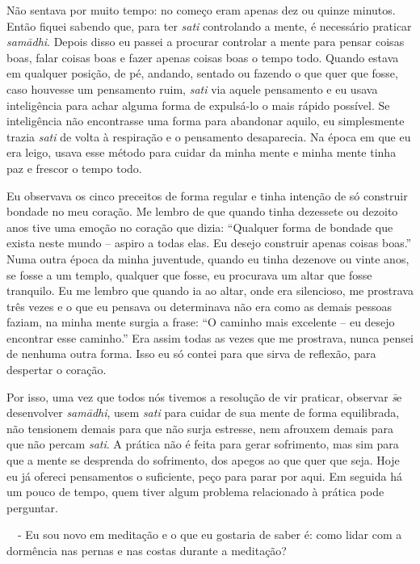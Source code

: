 Não sentava por muito tempo: no começo eram apenas dez ou quinze
minutos. Então fiquei sabendo que, para ter \textit{sati }controlando a
mente, é necessário praticar \textit{sam\=adhi}. Depois disso eu passei
a procurar controlar a mente para pensar coisas boas, falar coisas boas
e fazer apenas coisas boas o tempo todo. Quando estava em qualquer
posição, de pé, andando, sentado ou fazendo o que quer que fosse, caso
houvesse um pensamento ruim, \textit{sati }via aquele pensamento e eu
usava inteligência para achar alguma forma de expulsá-lo o mais rápido
possível. Se inteligência não encontrasse uma forma para abandonar
aquilo, eu simplesmente trazia \textit{sati }de volta à respiração e o
pensamento desaparecia. Na época em que eu era leigo, usava esse método
para cuidar da minha mente e minha mente tinha paz e frescor o tempo
todo.

Eu observava os cinco preceitos de forma regular e tinha intenção de
só construir bondade no meu coração. Me lembro de que quando tinha
dezessete ou dezoito anos tive uma emoção no coração que dizia:
“Qualquer forma de bondade que exista neste mundo – aspiro a todas
elas. Eu desejo construir apenas coisas boas.” Numa outra época da
minha juventude, quando eu tinha dezenove ou vinte anos, se fosse a um
templo, qualquer que fosse, eu procurava um altar que fosse tranquilo.
Eu me lembro que quando ia ao altar, onde era silencioso, me prostrava
três vezes e o que eu pensava ou determinava não era como as demais
pessoas faziam, na minha mente surgia a frase: “O caminho mais
excelente – eu desejo encontrar esse caminho.” Era assim todas as vezes
que me prostrava, nunca pensei de nenhuma outra forma. Isso eu só
contei para que sirva de reflexão, para despertar o coração. 

Por isso, uma vez que todos nós tivemos a resolução de vir praticar,
observar \textit{s\=\ila }e desenvolver \textit{sam\=adhi}, usem
\textit{sati }para cuidar de sua mente de forma equilibrada, não
tensionem demais para que não surja estresse, nem afrouxem demais para
que não percam \textit{sati}. A prática não é feita para gerar
sofrimento, mas sim para que a mente se desprenda do sofrimento, dos
apegos ao que quer que seja. Hoje eu já ofereci pensamentos o
suficiente, peço para parar por aqui. Em seguida há um pouco de tempo,
quem tiver algum problema relacionado à prática pode perguntar.

 \ \ - Eu sou novo em meditação e o que eu gostaria de saber é: como
lidar com a dormência nas pernas e nas costas durante a meditação?

